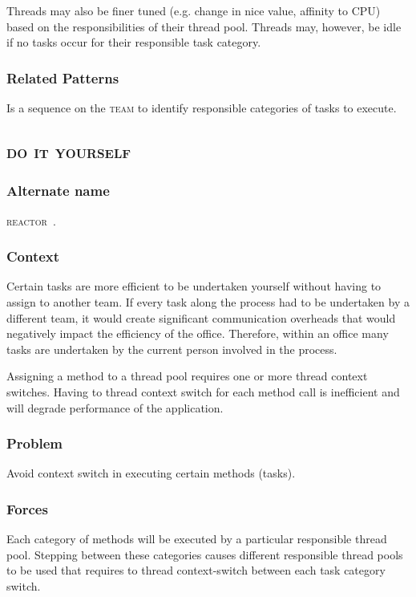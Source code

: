 \documentclass[prodmode]{style/acmlarge}
\begin{document}
Threads may also be finer tuned (e.g. change in nice value, affinity to CPU)
based on the responsibilities of their thread pool.  Threads may, however, be
idle if no tasks occur for their responsible task category.

\subsubsection*{Related Patterns} Is a sequence on the \textsc{team} to identify
responsible categories of tasks to execute.



\subsection{\textsc{\textbf{do it yourself}}}

\subsubsection*{Alternate name} \textsc{reactor}~\cite{reactor}.

\subsubsection*{Context} Certain tasks are more efficient to be undertaken
yourself without having to assign to another team.  If every task along the
process had to be undertaken by a different team, it would create significant
communication overheads that would negatively impact the efficiency of the
office.  Therefore, within an office many tasks are undertaken by the current
person involved in the process.

Assigning a method to a thread pool requires one or more thread context
switches.  Having to thread context switch for each method call is inefficient
and will degrade performance of the application.

\subsubsection*{Problem} Avoid context switch in executing certain methods (tasks).

\subsubsection*{Forces} Each category of methods will be executed by a particular
responsible thread pool.  Stepping between these categories causes different
responsible thread pools to be used that requires to thread context-switch between
each task category switch.
\end{document}
